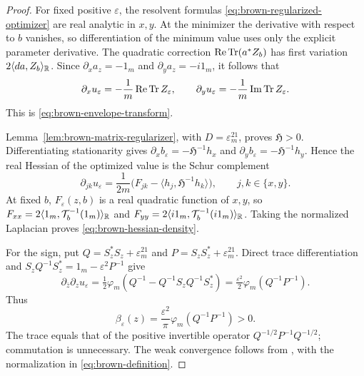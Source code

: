 \begin{proof}
For fixed positive $\varepsilon$, the resolvent formulas \eqref{eq:brown-regularized-optimizer} are real analytic in $x,y$.
At the minimizer the derivative with respect to $b$ vanishes, so differentiation of the minimum value uses only the explicit parameter derivative.
The quadratic correction $\operatorname{Re}\operatorname{Tr}(a^*Z_b)$ has first variation $2\langle da,Z_b\rangle_{\mathbb R}$.
Since $\partial_xa_z=-1_m$ and $\partial_ya_z=-i1_m$, it follows that
\[
 \partial_xu_\varepsilon=-\frac1m\operatorname{Re}\operatorname{Tr} Z_\varepsilon,
 \qquad
 \partial_yu_\varepsilon=-\frac1m\operatorname{Im}\operatorname{Tr} Z_\varepsilon.
\]
This is \eqref{eq:brown-envelope-transform}.

Lemma~\ref{lem:brown-matrix-regularizer}, with $D=\varepsilon^21_m$, proves $\mathfrak H>0$.
Differentiating stationarity gives $\partial_xb_\varepsilon=-\mathfrak H^{-1}h_x$ and $\partial_yb_\varepsilon=-\mathfrak H^{-1}h_y$.
Hence the real Hessian of the optimized value is the Schur complement
\begin{equation}\label{eq:brown-value-hessian}
 \partial_{jk}u_\varepsilon
  =\frac1{2m}\bigl(F_{jk}
        -\langle h_j,\mathfrak H^{-1}h_k\rangle\bigr),
 \qquad j,k\in\{x,y\}.
\end{equation}
At fixed $b$, $F_\varepsilon(z,b)$ is a real quadratic function of $x,y$, so $F_{xx}=2\langle1_m,\mathcal T_b^{-1}(1_m)\rangle_{\mathbb R}$ and $F_{yy}=2\langle i1_m,\mathcal T_b^{-1}(i1_m)\rangle_{\mathbb R}$.
Taking the normalized Laplacian proves \eqref{eq:brown-hessian-density}.

For the sign, put $Q=S_z^*S_z+\varepsilon^21_m$ and $P=S_zS_z^*+\varepsilon^21_m$.
Direct trace differentiation and $S_zQ^{-1}S_z^*=1_m-\varepsilon^2P^{-1}$ give
\[
 \partial_{\bar z}\partial_z u_\varepsilon
  =\tfrac12\varphi_m(Q^{-1}-Q^{-1}S_zQ^{-1}S_z^*)
  =\tfrac{\varepsilon^2}{2}\varphi_m(Q^{-1}P^{-1}).
\]
Thus
\begin{equation}\label{eq:positive-density}
 \beta_\varepsilon(z)=\frac{\varepsilon^2}{\pi}
                         \varphi_m(Q^{-1}P^{-1})>0.
\end{equation}
The trace equals that of the positive invertible operator $Q^{-1/2}P^{-1}Q^{-1/2}$; commutation is unnecessary.
The weak convergence follows from \cite[Chapter 11, Section 9, (11.14)--(11.15)]{MS17}, with the normalization in \eqref{eq:brown-definition}.
\end{proof}

